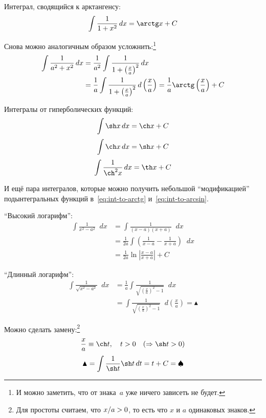 \documentclass[a4paper,12pt]{article}
\newcommand{\diff}{\mathop{}\!d}
\begin{document}
  Интеграл, сводящийся к арктангенсу:
  \[
    \int \frac{1}{1 + x^2} \diff x = \arctg x + C
  \]

  Снова можно аналогичным образом усложнить:\footnote{
    И можно заметить, что от знака~$a$ уже ничего зависеть не будет.
  }
  \begin{equation}
  \begin{split}\label{eq:int-to-arctg}
    \int \frac{1}{a^2 + x^2} \diff x
      &= \frac{1}{a^2} \int \frac{1}{1 + \left(\frac{x}{a}\right)^2} \diff x\\
      &= \frac{1}{a} \int \frac{1}{1 + \left(\frac{x}{a}\right)^2} \diff \left(\frac{x}{a}\right)
      = \frac{1}{a} \arctg\left(\frac{x}{a}\right) + C
  \end{split}
  \end{equation}

  Интегралы от гиперболических функций:
  \[
    \int \sh x \diff x = \ch x + C
  \]
  \[
    \int \ch x \diff x = \sh x + C
  \]
  \[
    \int \frac{1}{\ch^2 x} \diff x = \th x + C
  \]


  И ещё пара интегралов, которые можно получить небольшой ``модификацией'' подынтегральных функций в~\eqref{eq:int-to-arctg} и~\eqref{eq:int-to-arcsin}.

  ``Высокий логарифм'':
  \begin{equation}
  \begin{split}
    \int \frac{1}{x^2 - a^2} \diff x
      &= \int \frac{1}{(x - a)(x + a)} \diff x\\
      &= \frac{1}{2a} \int \left(\frac{1}{x - a} - \frac{1}{x + a}\right) \diff x\\
      &= \frac{1}{2a} \ln\left|\frac{x - a}{x + a}\right| + C
  \end{split}
  \end{equation}

  ``Длинный логарифм'':
  \begin{equation*}
  \begin{split}
    \int \frac{1}{\sqrt{x^2 - a^2}} \diff x
      &= \frac{1}{a} \int \frac{1}{\sqrt{\left(\frac{x}{a}\right)^2 - 1}} \diff x\\
      &= \int \frac{1}{\sqrt{\left(\frac{x}{a}\right)^2 - 1}} \diff\left(\frac{x}{a}\right) = \blacktriangle
  \end{split}
  \end{equation*}

  Можно сделать замену:\footnote{
    Для простоты считаем, что $x\hm/a \hm> 0$, то есть что $x$ и $a$ одинаковых знаков.
  }
  \[  %
      \frac{x}{a} \equiv \ch t,\quad t > 0\quad (\Rightarrow \sh t > 0)
  \]
  \[
    \blacktriangle = \int \frac{1}{\sh t} \sh t \diff t = t + C = \spadesuit
  \]
\end{document}
